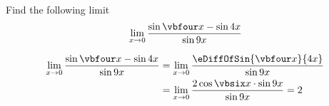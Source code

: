



\MULTIPLY{}\vbthree
\ADD\vbthree\vbtwo\vbfour
\ADD\vbfour\vbtwo\vbfive
\DIVIDE{}\vbsix

\question[2] Find the following limit \[ \lim_{x\to 0}\dfrac{\sin\vbfour x - \sin\vbtwo x}{\sin\vbone x}\]

\watchout[-40pt]

\begin{solution}[\mcq]
  \begin{align}
    \lim_{x\to 0}\dfrac{\sin\vbfour x - \sin\vbtwo x}{\sin\vbone x} &=
    \lim_{x\to 0}\dfrac{\eDiffOfSin{\vbfour x}{\vbtwo x}}{\sin\vbone x} \\
    &= \lim_{x\to 0}\dfrac{2\cos\vbsix x\cdot\sin\vbone x}{\sin\vbone x} = 2
  \end{align}
\end{solution}

